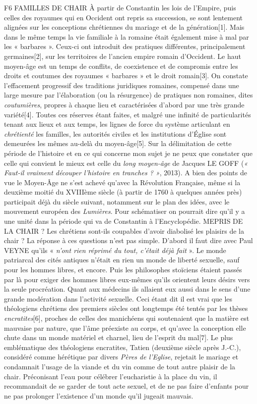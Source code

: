 F6 FAMILLES DE CHAIR
 À partir de Constantin les lois de l'Empire, puis celles des royaumes qui en Occident ont repris sa succession, se sont lentement alignées sur les conceptions chrétiennes du mariage et de la génération[1]. Mais dans le même temps la vie familiale à la romaine était également mise à mal par les « barbares ». Ceux-ci ont introduit des pratiques différentes, principalement germaines[2], sur les territoires de l'ancien empire romain d'Occident. Le haut moyen-âge est un temps de conflits, de coexistence et de compromis entre les droits et coutumes des royaumes « barbares » et le droit romain[3]. On constate l'effacement progressif des traditions juridiques romaines, compensé dans une large mesure par l'élaboration (ou la résurgence) de pratiques non romaines, dites \emph{coutumières}, propres à chaque lieu et caractérisées d'abord par une très grande variété[4]. 
 Toutes ces réserves étant faites, et malgré une infinité de particularités tenant aux lieux et aux temps, les lignes de force du système articulant en \emph{chrétienté} les familles, les autorités civiles et les institutions d'Église sont demeurées les mêmes au-delà du moyen-âge[5]. Sur la délimitation de cette période de l'histoire et en ce qui concerne mon sujet je ne peux que constater que celle qui convient le mieux est celle du \emph{long moyen-âge} de Jacques LE GOFF (\emph{« Faut-il vraiment découper l'histoire en tranches ? »}, 2013). A bien des points de vue le Moyen-Âge ne s'est achevé qu'avec la Révolution Française, même si la deuxième moitié du XVIIIème siècle (à partir de 1760 à quelques années près) participait déjà du siècle suivant, notamment sur le plan des idées, avec le mouvement européen des \emph{Lumières}. Pour schématiser on pourrait dire qu'il y a une unité dans la période qui va de Constantin à l'Encyclopédie. 
MEPRIS DE LA CHAIR ?
 Les chrétiens sont-ils coupables d'avoir diabolisé les plaisirs de la chair ? La réponse à ces questions n'est pas simple. D'abord il faut dire avec Paul VEYNE qu'ils « \emph{n'ont rien réprimé du tout, c'était déjà fait} ». Le monde patriarcal des cités antiques n'était en rien un monde de liberté sexuelle, sauf pour les hommes libres, et encore. Puis les philosophes stoïciens étaient passés par là pour exiger des hommes libres eux-mêmes qu'ils orientent leurs désirs vers la seule procréation. Quant aux médecins ils allaient eux aussi dans le sens d'une grande modération dans l'activité sexuelle. 
 Ceci étant dit il est vrai que les théologiens chrétiens des premiers siècles ont longtemps été tentés par les thèses \emph{encratites}[6], proches de celles des manichéens qui soutenaient que la matière est mauvaise par nature, que l'âme préexiste au corps, et qu'avec la conception elle chute dans un monde matériel et charnel, lieu de l'esprit du mal[7]. Le plus emblématique des théologiens encratites, Tatien (deuxième siècle après J.-C.), considéré comme hérétique par divers \emph{Pères de l'Eglise}, rejetait le mariage et condamnait l'usage de la viande et du vin comme de tout autre plaisir de la chair. Préconisant l'eau pour célébrer l'eucharistie à la place du vin, il recommandait de se garder de tout acte sexuel, et de ne pas faire d'enfants pour ne pas prolonger l'existence d'un monde qu'il jugeait mauvais. 
